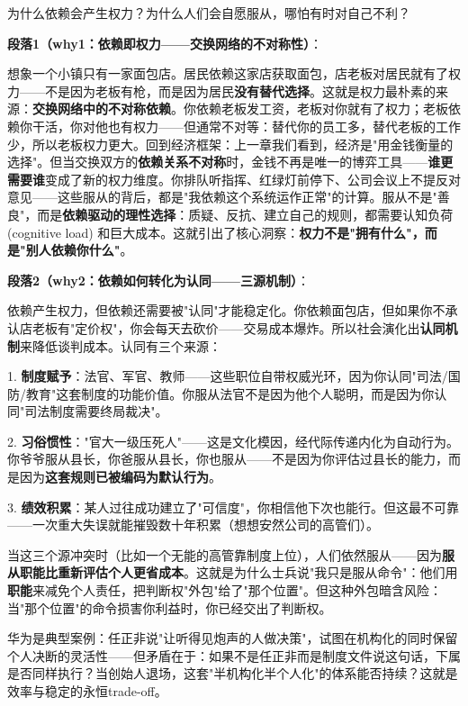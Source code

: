 \documentclass[../main.tex]{subfiles}
\begin{document}
	\begin{questionbox}

		为什么依赖会产生权力？为什么人们会自愿服从，哪怕有时对自己不利？

	\end{questionbox}
	
	\textbf{段落1（why1：依赖即权力——交换网络的不对称性）}：  

	想象一个小镇只有一家面包店。居民依赖这家店获取面包，店老板对居民就有了权力——不是因为老板有枪，而是因为居民\textbf{没有替代选择}。这就是权力最朴素的来源：\textbf{交换网络中的不对称依赖}。你依赖老板发工资，老板对你就有了权力；老板依赖你干活，你对他也有权力——但通常不对等：替代你的员工多，替代老板的工作少，所以老板权力更大。回到经济框架：上一章我们看到，经济是"用金钱衡量的选择"。但当交换双方的\textbf{依赖关系不对称}时，金钱不再是唯一的博弈工具——\textbf{谁更需要谁}变成了新的权力维度。你排队听指挥、红绿灯前停下、公司会议上不提反对意见——这些服从的背后，都是"我依赖这个系统运作正常"的计算。服从不是"善良"，而是\textbf{依赖驱动的理性选择}：质疑、反抗、建立自己的规则，都需要认知负荷 (cognitive load) 和巨大成本。这就引出了核心洞察：\textbf{权力不是"拥有什么"，而是"别人依赖你什么"}。
	
	\textbf{段落2（why2：依赖如何转化为认同——三源机制）}：  

	依赖产生权力，但依赖还需要被"认同"才能稳定化。你依赖面包店，但如果你不承认店老板有"定价权"，你会每天去砍价——交易成本爆炸。所以社会演化出\textbf{认同机制}来降低谈判成本。认同有三个来源：  

    1. \textbf{制度赋予}：法官、军官、教师——这些职位自带权威光环，因为你认同"司法/国防/教育"这套制度的功能价值。你服从法官不是因为他个人聪明，而是因为你认同"司法制度需要终局裁决"。  

    2. \textbf{习俗惯性}："官大一级压死人"——这是文化模因，经代际传递内化为自动行为。你爷爷服从县长，你爸服从县长，你也服从——不是因为你评估过县长的能力，而是因为\textbf{这套规则已被编码为默认行为}。  

    3. \textbf{绩效积累}：某人过往成功建立了"可信度"，你相信他下次也能行。但这最不可靠——一次重大失误就能摧毁数十年积累（想想安然公司的高管们）。  

    当这三个源冲突时（比如一个无能的高管靠制度上位），人们依然服从——因为\textbf{服从职能比重新评估个人更省成本}。这就是为什么士兵说"我只是服从命令"：他们用\textbf{职能}来减免个人责任，把判断权"外包"给了"那个位置"。但这种外包暗含风险：当"那个位置"的命令损害你利益时，你已经交出了判断权。
	
	华为是典型案例：任正非说"让听得见炮声的人做决策"，试图在机构化的同时保留个人决断的灵活性——但矛盾在于：如果不是任正非而是制度文件说这句话，下属是否同样执行？当创始人退场，这套"半机构化半个人化"的体系能否持续？这就是效率与稳定的永恒trade-off。
\end{document}
